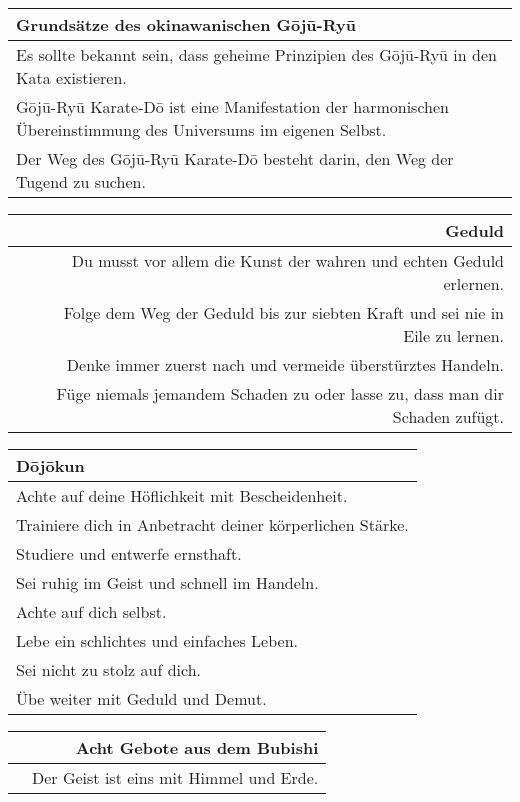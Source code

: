 	\begin{footnotesize}
	\begin{tabularx}{\textwidth}{X}
		\textbf{Grundsätze des okinawanischen G\={o}j\={u}-Ry\={u}} \\
		\midrule
		Es sollte bekannt sein, dass geheime Prinzipien des G\={o}j\={u}-Ry\={u} in den Kata existieren. \\
		G\={o}j\={u}-Ry\={u} Karate-D\={o} ist eine Manifestation der harmonischen Übereinstimmung des Universums im eigenen Selbst. \\ 
		Der Weg des G\={o}j\={u}-Ry\={u} Karate-D\={o} besteht darin, den Weg der Tugend zu suchen.\\
	\end{tabularx}\null\vfill\null
	\begin{tabularx}{\textwidth}{Xr}	
		\hfill & \textbf{Geduld} \\
		\midrule
		\hfill & Du musst vor allem die Kunst der wahren und echten Geduld erlernen. \\
		\hfill & Folge dem Weg der Geduld bis zur siebten Kraft und sei nie in Eile zu lernen. \\
		\hfill & Denke immer zuerst nach und vermeide überstürztes Handeln. \\
		\hfill & Füge niemals jemandem Schaden zu oder lasse zu, dass man dir Schaden zufügt. \\
	\end{tabularx}\null\vfill\null
	\begin{tabularx}{\textwidth}{X}	
		\textbf{D\={o}j\={o}kun}\\
		\midrule
		Achte auf deine Höflichkeit mit Bescheidenheit. \\
		Trainiere dich in Anbetracht deiner körperlichen Stärke. \\
		Studiere und entwerfe ernsthaft. \\
		Sei ruhig im Geist und schnell im Handeln. \\
		Achte auf dich selbst. \\
		Lebe ein schlichtes und einfaches Leben. \\
		Sei nicht zu stolz auf dich. \\
		Übe weiter mit Geduld und Demut. \\
	\end{tabularx}\null\vfill\null
	\begin{tabularx}{\textwidth}{Xr}	
		\hfill & \textbf{Acht Gebote aus dem Bubishi}\\
		\midrule
		\hfill & Der Geist ist eins mit Himmel und Erde. \\

\end{tabularx}
\end{footnotesize}
